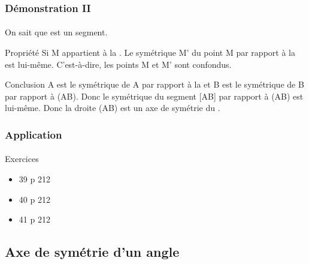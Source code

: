 \documentclass{beamer}
\begin{document}
\begin{frame}
	\frametitle{Démonstration II}  
	\framesubtitle{}
	
	\begin{block}{On sait que}
		 est un segment.\pause
	\end{block}
	
	\begin{block}{Propriété}
		Si M appartient à la .
		Le symétrique M' du point M par rapport à la  est lui-même.
		C'est-à-dire, les points M et M' sont confondus.\pause
	\end{block}
	
	\begin{block}{Conclusion}
		A est le symétrique de A par rapport à la  et B est le symétrique de B par rapport à (AB).
		Donc le symétrique du segment [AB] par rapport à (AB) est lui-même.
		Donc la droite (AB) est un axe de symétrie du \seg[AB].
	\end{block}
\end{frame}

\begin{frame}
	\frametitle{Application}  
	\framesubtitle{}
	
	\begin{block}{Exercices}
		\begin{itemize}
			\item 39 p 212
			\item 40 p 212
			\item 41 p 212
		\end{itemize}
	\end{block}
\end{frame}

\subsection{Axe de symétrie d'un angle}
\end{document}
